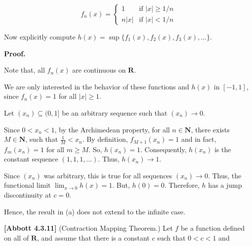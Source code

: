 \documentclass[10pt]{article}
\begin{document}
\begin{equation*}
f_{n}( x) =\begin{cases}
1 & \text{if } |x|\geq 1/n\\
n|x| & \text{if } |x|< 1/n
\end{cases}
\end{equation*}


Now explicitly compute $\displaystyle h( x) =\sup \{f_{1}( x) ,f_{2}( x) ,f_{3}( x) ,\dotsc \}$.



\textbf{Proof.}



Note that, all $\displaystyle f_{n}( x)$ are continuous on $\displaystyle \mathbf{R}$.



We are only interested in the behavior of these functions and $\displaystyle h( x)$ in $\displaystyle [ -1,1]$, since $\displaystyle f_{n}( x) =1$ for all $\displaystyle |x|\geq 1$. 



Let $\displaystyle ( x_{n}) \subseteq ( 0,1]$ be an arbitrary sequence such that $\displaystyle ( x_{n})\rightarrow 0$. 



Since $\displaystyle 0< x_{n} < 1$, by the Archimedean property, for all $\displaystyle n\in \mathbf{N}$, there exists $\displaystyle M\in \mathbf{N}$, such that $\displaystyle \frac{1}{M} < x_{n}$. By definition, $\displaystyle f_{M+1}( x_{n}) =1$ and in fact, $\displaystyle f_{m}( x_{n}) =1$ for all $\displaystyle m\geq M$. So, $\displaystyle h( x_{n}) =1$. Consequently, $\displaystyle h( x_{n})$ is the constant sequence $\displaystyle ( 1,1,1,\dotsc )$. Thus, $\displaystyle h( x_{n})\rightarrow 1$.



Since $\displaystyle ( x_{n})$ was arbitrary, this is true for all sequences $\displaystyle ( x_{n})\rightarrow 0$. Thus, the functional limit $\displaystyle \lim _{x\rightarrow 0} h( x) =1$. But, $\displaystyle h( 0) =0$. Therefore, $\displaystyle h$ has a jump discontinuity at $\displaystyle c=0$.



Hence, the result in (a) does not extend to the infinite case.



\textbf{[Abbott 4.3.11]} (Contraction Mapping Theorem.) Let $\displaystyle f$ be a function defined on all of $\displaystyle \mathbf{R}$, and assume that there is a constant $\displaystyle c$ such that $\displaystyle 0< c< 1$ and 
\end{document}
